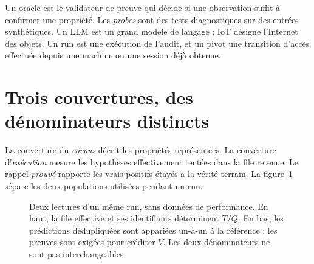 \documentclass[11pt,a4paper]{article}
\begin{document}
Un oracle est le validateur de preuve qui décide si une observation suffit à
confirmer une propriété. Les \emph{probes} sont des tests diagnostiques sur des
entrées synthétiques. Un LLM est un grand modèle de langage ; IoT désigne
l'Internet des objets. Un run est une exécution de l'audit, et un pivot une
transition d'accès effectuée depuis une machine ou une session déjà obtenue.

\section{Trois couvertures, des dénominateurs distincts}
\label{sec:denominators}
La couverture du \emph{corpus} décrit les propriétés représentées. La couverture d'\emph{exécution} mesure les hypothèses effectivement tentées dans la file retenue. Le rappel \emph{prouvé} rapporte les vrais positifs étayés à la vérité terrain. La figure~\ref{fig:denominators} sépare les deux populations utilisées pendant un run.

\begin{figure}[H]
\centering
{}
\caption{Deux lectures d'un même run, sans données de performance. En haut, la file effective et ses identifiants déterminent $T/Q$. En bas, les prédictions dédupliquées sont appariées un-à-un à la référence ; les preuves sont exigées pour créditer $V$. Les deux dénominateurs ne sont pas interchangeables.}
\label{fig:denominators}
\end{figure}
\end{document}
